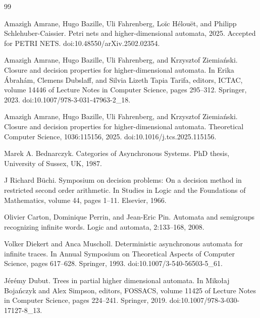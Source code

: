 \documentclass[10pt,a4paper]{article}
\begin{document}
\begin{thebibliography}{99}
\par\noindent    Amazigh Amrane, Hugo Bazille, Uli Fahrenberg, Loïc Hélouët, and Philipp Schlehuber-Caissier.  Petri nets and higher-dimensional automata, 2025.  Accepted for PETRI NETS.  doi:10.48550/arXiv.2502.02354.  

\par\noindent    Amazigh Amrane, Hugo Bazille, Uli Fahrenberg, and Krzysztof Ziemiański.  Closure and decision properties for higher-dimensional automata.  In Erika Ábrahám, Clemens Dubslaff, and Silvia Lizeth Tapia Tarifa, editors, ICTAC, volume 14446 of Lecture Notes in Computer Science, pages 295–312. Springer, 2023.  doi:10.1007/978-3-031-47963-2\_18.  

\par\noindent    Amazigh Amrane, Hugo Bazille, Uli Fahrenberg, and Krzysztof Ziemiański.  Closure and decision properties for higher-dimensional automata.  Theoretical Computer Science, 1036:115156, 2025.  doi:10.1016/j.tcs.2025.115156.  

\par\noindent    Marek A. Bednarczyk.  Categories of Asynchronous Systems.  PhD thesis, University of Sussex, UK, 1987.  

\par\noindent    J Richard Büchi.  Symposium on decision problems: On a decision method in restricted second order arithmetic.  In Studies in Logic and the Foundations of Mathematics, volume 44, pages 1–11. Elsevier, 1966.  

\par\noindent    Olivier Carton, Dominique Perrin, and Jean-Eric Pin.  Automata and semigroups recognizing infinite words.  Logic and automata, 2:133–168, 2008.  

\par\noindent    Volker Diekert and Anca Muscholl.  Deterministic asynchronous automata for infinite traces.  In Annual Symposium on Theoretical Aspects of Computer Science, pages 617–628. Springer, 1993.  doi:10.1007/3-540-56503-5\_61.  

\par\noindent    Jérémy Dubut.  Trees in partial higher dimensional automata.  In Mikołaj Bojańczyk and Alex Simpson, editors, FOSSACS, volume 11425 of Lecture Notes in Computer Science, pages 224–241. Springer, 2019.  doi:10.1007/978-3-030-17127-8\_13.  


\end{thebibliography}
\end{document}
